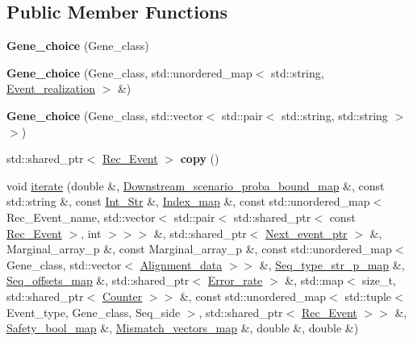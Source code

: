 \subsection*{Public Member Functions}
\begin{DoxyCompactItemize}
\item 
\mbox{\label{classGene__choice_aadae79625212bc82c78bce9849e8325a}} 
{\bfseries Gene\+\_\+choice} (Gene\+\_\+class)
\item 
\mbox{\label{classGene__choice_a1fcb013e222239211ce0f1137d416157}} 
{\bfseries Gene\+\_\+choice} (Gene\+\_\+class, std\+::unordered\+\_\+map$<$ std\+::string, \hyperlink{structEvent__realization}{Event\+\_\+realization} $>$ \&)
\item 
\mbox{\label{classGene__choice_af5558f7c579350c4dc044bd37f26423e}} 
{\bfseries Gene\+\_\+choice} (Gene\+\_\+class, std\+::vector$<$ std\+::pair$<$ std\+::string, std\+::string $>$$>$)
\item 
\mbox{\label{classGene__choice_a04760e99cded10a20cb757de374e2c66}} 
std\+::shared\+\_\+ptr$<$ \hyperlink{classRec__Event}{Rec\+\_\+\+Event} $>$ {\bfseries copy} ()
\item 
void \hyperlink{classGene__choice_ab036f686e32561d4db2aa9eca3be4cf0}{iterate} (double \&, \hyperlink{classEnum__fast__memory__map}{Downstream\+\_\+scenario\+\_\+proba\+\_\+bound\+\_\+map} \&, const std\+::string \&, const \hyperlink{classInt__Str}{Int\+\_\+\+Str} \&, \hyperlink{classEnum__fast__memory__map}{Index\+\_\+map} \&, const std\+::unordered\+\_\+map$<$ Rec\+\_\+\+Event\+\_\+name, std\+::vector$<$ std\+::pair$<$ std\+::shared\+\_\+ptr$<$ const \hyperlink{classRec__Event}{Rec\+\_\+\+Event} $>$, int $>$$>$$>$ \&, std\+::shared\+\_\+ptr$<$ \hyperlink{classRec__Event}{Next\+\_\+event\+\_\+ptr} $>$ \&, Marginal\+\_\+array\+\_\+p \&, const Marginal\+\_\+array\+\_\+p \&, const std\+::unordered\+\_\+map$<$ Gene\+\_\+class, std\+::vector$<$ \hyperlink{structAlignment__data}{Alignment\+\_\+data} $>$$>$ \&, \hyperlink{classEnum__fast__memory__map}{Seq\+\_\+type\+\_\+str\+\_\+p\+\_\+map} \&, \hyperlink{classEnum__fast__memory__dual__key__map}{Seq\+\_\+offsets\+\_\+map} \&, std\+::shared\+\_\+ptr$<$ \hyperlink{classError__rate}{Error\+\_\+rate} $>$ \&, std\+::map$<$ size\+\_\+t, std\+::shared\+\_\+ptr$<$ \hyperlink{classCounter}{Counter} $>$$>$ \&, const std\+::unordered\+\_\+map$<$ std\+::tuple$<$ Event\+\_\+type, Gene\+\_\+class, Seq\+\_\+side $>$, std\+::shared\+\_\+ptr$<$ \hyperlink{classRec__Event}{Rec\+\_\+\+Event} $>$$>$ \&, \hyperlink{classEnum__fast__memory__map}{Safety\+\_\+bool\+\_\+map} \&, \hyperlink{classEnum__fast__memory__map}{Mismatch\+\_\+vectors\+\_\+map} \&, double \&, double \&)

\end{DoxyCompactItemize}

